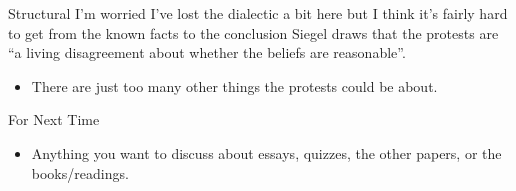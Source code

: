 \documentclass[
  17pt,
  letterpaper,
  ignorenonframetext,
  aspectratio=169,
  xcolor={dvipsnames}]{beamer}
\providecommand{\tightlist}{%
  \setlength{\itemsep}{0pt}\setlength{\parskip}{0pt}}\usepackage{longtable,booktabs,array}
\begin{document}
\begin{frame}{Structural}
\protect\hypertarget{structural-1}{}
I'm worried I've lost the dialectic a bit here but I think it's fairly
hard to get from the known facts to the conclusion Siegel draws that the
protests are ``a living disagreement about whether the beliefs are
reasonable''.

\begin{itemize}[<+->]
\tightlist
\item
  There are just too many other things the protests could be about.
\end{itemize}
\end{frame}

\begin{frame}{For Next Time}
\protect\hypertarget{for-next-time}{}
\begin{itemize}[<+->]
\tightlist
\item
  Anything you want to discuss about essays, quizzes, the other papers,
  or the books/readings.
\end{itemize}
\end{frame}
\end{document}

